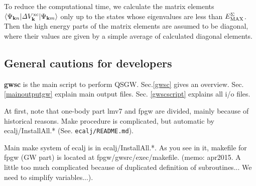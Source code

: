 \documentclass[a4paper,10pt,epsf,fleqn]{article}
\def\Psikn{\Psi_{{\bf k}n}}
\def\Dvxc{{\it \Delta} V^{\rm xc}}
\def\Psikn{{\Psi_{{\bf k}n}}}
\def\Psikm{{\Psi_{{\bf k}m}}}
\def\EMAXS{E_{\rm MAX}^\Sigma}
\newcommand{\bfk}{{\bf k}}
\newcommand{\exe}[1]{{\bf #1}}
\newcommand{\io}[1]{{\sf  #1}}
\newcommand{\raw}[1]{{\tt #1}}
\begin{document}
To reduce the computational time,
we calculate the matrix elements $\langle \Psikn |\Dvxc_\bfk | \Psikm \rangle$ only up to the states whose
eigenvalues are less than $\EMAXS$. 
Then the high energy parts of the matrix elements are assumed 
to be diagonal, where their values are given by a simple average 
of calculated diagonal elements.







\subsection{General cautions for developers}
\exe{gwsc} is the main script to perform QSGW.
Sec.\ref{gwsc} gives an overview.
Sec.\ref{mainoutputgw} explain main output files.
Sec. \ref{gwscscript} explains all i/o files.

At first, note that one-body part \io{lmv7} and \io{fpgw}
are divided, mainly because of historical reasons.
Make procedure is complicated, but automatic
by \io{ecalj/InstallAll.*} (See. \raw{ecalj/README.md}).

Main make system of ecalj is in ecalj/InstallAll.*.
As you see in it, makefile for fpgw (GW part) is 
located at \io{fpgw/gwsrc/exec/makefile}. 
(memo:
apr2015. A little too much complicated because of duplicated definition
of subroutines... We need to simplify variables...).
\end{document}
